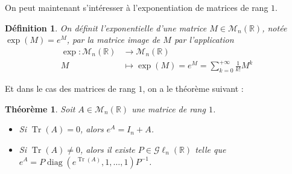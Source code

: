 \documentclass[a4paper]{article}
\newtheorem*{theorem}{Théorème}
\newtheorem*{definition}{Définition}
\begin{document}
On peut maintenant s'intéresser à l'exponentiation de matrices de rang $1$.

\begin{definition}
    On définit l'exponentielle d'une matrice $M \in \mathcal{M}_{n}(\mathbb{R})$, notée $\exp(M) = e^M$, par la matrice image de $M$ par l'application
    \begin{align*}
    \exp : \mathcal{M}_{n}(\mathbb{R}) &\longrightarrow \mathcal{M}_{n}(\mathbb{R})\\
    M &\longmapsto \exp(M) = e^M = \sum_{k=0}^{+\infty} \frac{1}{k!}M^k
    \end{align*}
\end{definition}

Et dans le cas des matrices de rang $1$, on a le théorème suivant :

\begin{theorem}
    Soit $A \in \mathcal{M}_{n}(\mathbb{R})$ une matrice de rang $1$.
    \begin{itemize}
        \item Si $\operatorname{Tr}(A) = 0$, alors $e^A = I_n +A$.
        \item Si $\operatorname{Tr}(A) \neq 0$, alors il existe $P \in \mathcal{G}\ell_n(\mathbb{R})$ telle que $e^A = P\operatorname{diag}(e^{\operatorname{Tr}(A)}, 1, \dots, 1)P^{-1}$.
    \end{itemize}
\end{theorem}
\end{document}
